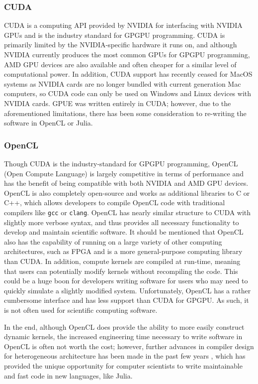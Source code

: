 \subsubsection{CUDA}
CUDA is a computing API provided by NVIDIA for interfacing with NVIDIA GPUs and is the industry standard for GPGPU programming.
CUDA is primarily limited by the NVIDIA-specific hardware it runs on, and although NVIDIA currently produces the most common GPUs for GPGPU programming, AMD GPU devices are also available and often cheaper for a similar level of computational power.
In addition, CUDA support has recently ceased for MacOS systems as NVIDIA cards are no longer bundled with current generation Mac computers, so CUDA code can only be used on Windows and Linux devices with NVIDIA cards.
GPUE was written entirely in CUDA; however, due to the aforementioned limitations, there has been some consideration to re-writing the software in OpenCL or Julia.

\subsubsection{OpenCL}

Though CUDA is the industry-standard for GPGPU programming, OpenCL (Open Compute Language) is largely competitive in terms of performance and has the benefit of being compatible with both NVIDIA and AMD GPU devices.
OpenCL is also completely open-source and works as additional libraries to C or C++, which allows developers to compile OpenCL code with traditional compilers like \texttt{gcc} or \texttt{clang}.
OpenCL has nearly similar structure to CUDA with slightly more verbose syntax, and thus provides all necessary functionality to develop and maintain scientific software.
It should be mentioned that OpenCL also has the capability of running on a large variety of other computing architectures, such as FPGA and is a more general-purpose computing library than CUDA.
In addition, compute kernels are compiled at run-time, meaning that users can potentially modify kernels without recompiling the code.
This could be a huge boon for developers writing software for users who may need to quickly simulate a slightly modified system.
Unfortunately, OpenCL has a rather cumbersome interface and has less support than CUDA for GPGPU.
As such, it is not often used for scientific computing software.

In the end, although OpenCL does provide the ability to more easily construct dynamic kernels, the increased engineering time necessary to write software in OpenCL is often not worth the cost; however, further advances in compiler design for heterogeneous architecture has been made in the past few years \cite{besard2019}, which has provided the unique opportunity for computer scientists to write maintainable and fast code in new languages, like Julia.

